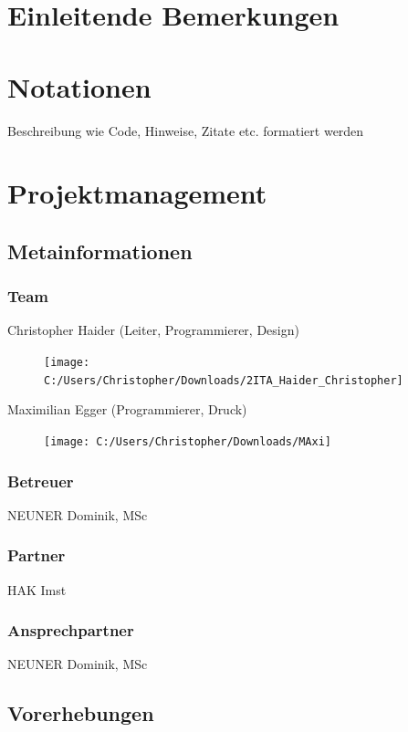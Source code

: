 \def \currentAuthor {Gabi Sorglos} %

\chapter*{Einleitende Bemerkungen}

\chapter*{Notationen}
Beschreibung wie Code, Hinweise, Zitate etc. formatiert werden  

\chapter{Projektmanagement}

\section{Metainformationen}
\subsection{Team}
Christopher Haider (Leiter, Programmierer, Design)\begin{figure}
	\centering
	\texttt{[image: C:/Users/Christopher/Downloads/2ITA\_Haider\_Christopher]}
	\caption{}
	\label{fig:2itahaiderchristopher}
\end{figure}

Maximilian Egger (Programmierer, Druck)\begin{figure}
	\centering
	\texttt{[image: C:/Users/Christopher/Downloads/MAxi]}
	\caption{}
	\label{fig:maxi}
\end{figure}

\subsection{Betreuer}
NEUNER Dominik, MSc
\subsection{Partner}
HAK Imst
\subsection{Ansprechpartner}
NEUNER Dominik, MSc
\section{Vorerhebungen}

